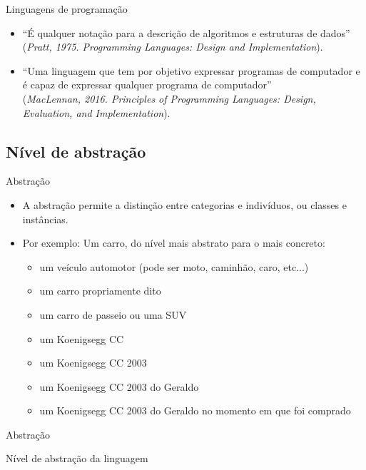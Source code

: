 \documentclass[handout, aspectratio=169]{beamer}
\newcommand{\bi}{\begin{itemize}[<+->]}
\newcommand{\ei}{\end{itemize}}
\begin{document}
\begin{frame}{Linguagens de programação}
   \bi
   \item ``É qualquer notação para a descrição de algoritmos e estruturas de dados'' \\ (\textit{\scriptsize  Pratt, 1975. Programming Languages: Design and Implementation}). \\[5mm]
   \item ``Uma linguagem que tem por objetivo expressar programas de computador e é capaz de expressar qualquer programa de computador'' \\ (\textit{\scriptsize MacLennan, 2016. Principles of Programming Languages: Design, Evaluation, and Implementation}).
   \ei
\end{frame}

\subsection{Nível de abstração}


\begin{frame}{Abstração}
   \bi
   \item A abstração permite a distinção entre categorias e indivíduos, ou classes e instâncias.
	\item Por exemplo: Um carro, do nível mais abstrato para o mais concreto:
		\bi
		\item um veículo automotor (pode ser moto, caminhão, caro, etc...)
        \item um carro propriamente dito
        \item um carro de passeio ou uma SUV
        \item um Koenigsegg CC
        \item um Koenigsegg CC 2003
        \item um Koenigsegg CC 2003 do Geraldo
        \item um Koenigsegg CC 2003 do Geraldo no momento em que foi comprado
		\ei
  \ei
\end{frame}

\begin{frame}{Abstração}


\begin{block}{Nível de abstração da linguagem}
\scriptsize
\centering

\end{block}
\end{frame}
\end{document}
